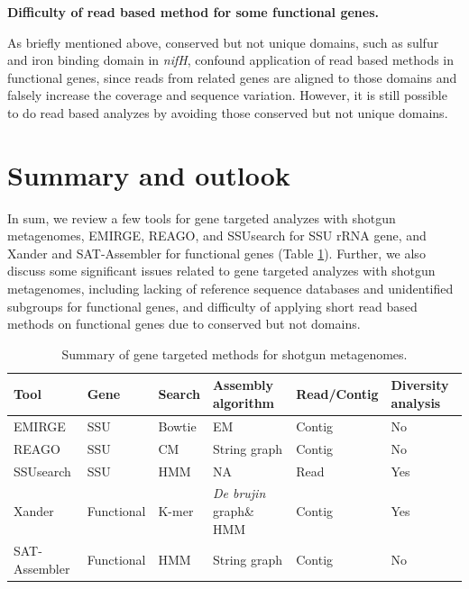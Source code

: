 \documentclass[]{msu-thesis}
\begin{document}
\textbf{Difficulty of read based method for some functional genes.}

As briefly mentioned above, conserved but not unique domains, such as
sulfur and iron binding domain in \textit{nifH}, confound application
of read based methods in functional genes, since reads from related
genes are aligned to those domains and falsely increase the coverage
and sequence variation. However, it is still possible to do read based
analyzes by avoiding those conserved but not unique domains.

\section{Summary and outlook}

In sum, we review a few tools for gene targeted analyzes with shotgun
metagenomes, EMIRGE, REAGO, and SSUsearch for SSU rRNA gene, and
Xander and SAT-Assembler for functional genes (Table
\ref{tab:toolSumm}). Further, we also discuss some significant issues
related to gene targeted analyzes with shotgun metagenomes, including
lacking of reference sequence databases and unidentified subgroups for
functional genes, and difficulty of applying short read based methods
on functional genes due to conserved but not domains.

\begin{table}[htbp]
  \centering
  \caption[Summary of gene targeted methods for shotgun metagenomes]{Summary of gene targeted methods for shotgun metagenomes.}
    \begin{tabular}{|llllll|}
    \toprule
    Tool  & Gene & Search & Assembly algorithm & Read/Contig & Diversity analysis \\
    \midrule
    EMIRGE & SSU & Bowtie & EM    & Contig & No \\
    REAGO & SSU & CM    & String graph & Contig & No \\
    SSUsearch & SSU & HMM   & NA    & Read  & Yes \\
    Xander & Functional & K-mer & \textit{De brujin} graph\& HMM & Contig & Yes \\
    SAT-Assembler & Functional & HMM   & String graph & Contig & No \\
    \bottomrule
    \end{tabular}%
  \label{tab:toolSumm}%
\end{table}%
\end{document}
